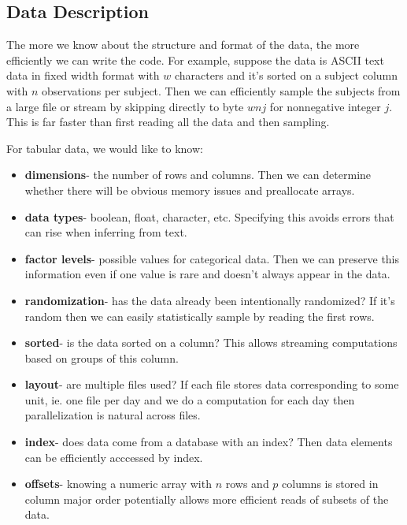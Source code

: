 \documentclass[12pt]{article}
\begin{document}
\subsection{Data Description}

The more we know about the structure and format of the data, the more
efficiently we can write the code. For example, suppose the data is
ASCII text data in fixed width format with $w$ characters and it's sorted on a
subject column with $n$ observations per subject. Then we can efficiently
sample the subjects from a large file or stream by skipping directly to byte $wnj$
for nonnegative integer $j$. This is far faster than first reading all the data and
then sampling.

For tabular data, we would like to know:

\begin{itemize}
    \item \textbf{dimensions}- the number of rows and columns. Then we can determine
        whether there will be obvious memory issues and preallocate arrays.
    \item \textbf{data types}- boolean, float, character, etc. Specifying this avoids errors
        that can rise when inferring from text.
    \item \textbf{factor levels}- possible values for categorical data.
        Then we can preserve this information even if one value is rare and
        doesn't always appear in the data.
    \item \textbf{randomization}- has the data already been intentionally randomized?
        If it's random then we can easily statistically sample by reading
        the first rows.
    \item \textbf{sorted}- is the data sorted on a column? This allows
        streaming computations based on groups of this column.
    \item \textbf{layout}- are multiple files used? If each file stores
        data corresponding to some unit, ie. one file per day and we do a
        computation for each day then parallelization is natural across
        files.
    \item \textbf{index}- does data come from a database with an index?
        Then data elements can be efficiently acccessed by index.
    \item \textbf{offsets}- knowing a numeric array with $n$ rows and $p$
        columns is stored in column major order potentially allows more
        efficient reads of subsets of the data.
\end{itemize}
\end{document}
